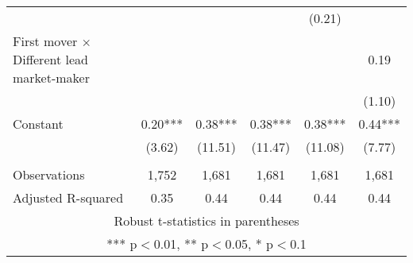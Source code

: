 \documentclass[]{article}
\begin{document}
\begin{tabular}{lccccc}
 &  &  &  & (0.21) &  \\
First mover $\times$ Different lead market-maker &  &  &  &  & 0.19 \\
 &  &  &  &  & (1.10) \\
Constant & 0.20*** & 0.38*** & 0.38*** & 0.38*** & 0.44*** \\
 & (3.62) & (11.51) & (11.47) & (11.08) & (7.77) \\
 &  &  &  &  &  \\
Observations & 1,752 & 1,681 & 1,681 & 1,681 & 1,681 \\
 Adjusted R-squared & 0.35 & 0.44 & 0.44 & 0.44 & 0.44 \\ \hline
\multicolumn{6}{c}{ Robust t-statistics in parentheses} \\
\multicolumn{6}{c}{ *** p$<$0.01, ** p$<$0.05, * p$<$0.1} \\
\end{tabular}
\end{document}
